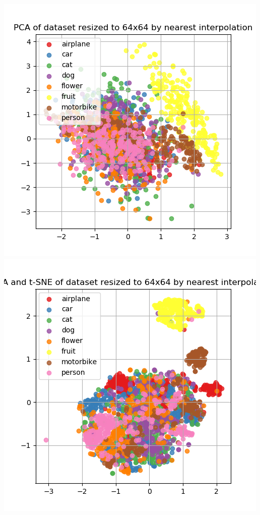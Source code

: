 \documentclass{article}
\begin{document}
\begin{minipage}[c]{\linewidth}
	\centering
	\includegraphics[width=\figureWidth\textwidth]{./figures/pca_h64_w64_r_smote.png}
	\includegraphics[width=\figureWidth\textwidth]{./figures/pca_tsne_h64_w64_r_smote.png}

\end{minipage}
\end{document}
